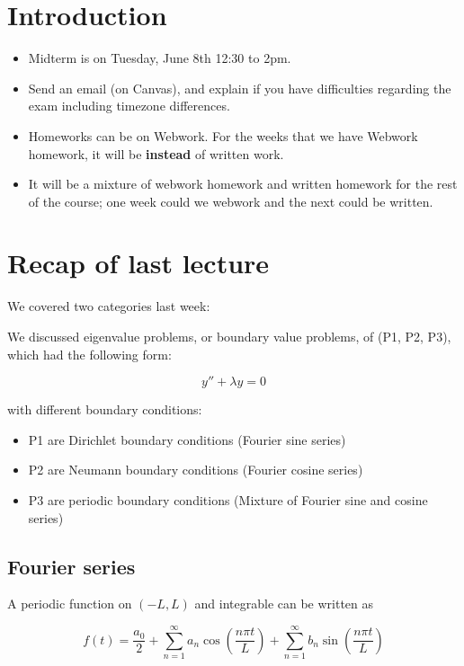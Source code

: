 
\graphicspath{{./Lecture8/}}
\section{Introduction}

\begin{itemize}
    \item Midterm is on Tuesday, June 8th 12:30 to 2pm. 
    \item Send an email (on Canvas), and explain if you have difficulties regarding the exam including timezone differences. 
    \item Homeworks can be on Webwork. For the weeks that we have Webwork homework, it will be \textbf{instead} of written work. 
    \item It will be a mixture of webwork homework and written homework for the rest of the course; one week could we webwork and the next could be written. 
\end{itemize}

\section{Recap of last lecture}

We covered two categories last week:

We discussed eigenvalue problems, or boundary value problems, of (P1, P2, P3), which had the following form:

$$y'' + \lambda y = 0$$

with different boundary conditions:

\begin{itemize}
    \item P1 are Dirichlet boundary conditions (Fourier sine series)
    \item P2 are Neumann boundary conditions (Fourier cosine series)
    \item P3 are periodic boundary conditions (Mixture of Fourier sine and cosine series)
\end{itemize}

\subsection{Fourier series}

A periodic function on $(-L, L)$ and integrable can be written as 

$$f(t) = \frac{a_0}{2} + \sum_{n = 1}^\infty a_n \cos(\frac{n \pi t}{L}) + \sum_{n = 1}^\infty b_n \sin(\frac{n \pi t}{L})$$

